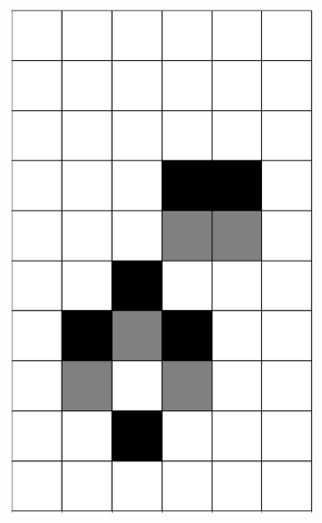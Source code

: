 \documentclass[12pt]{article}
\numberwithin{figure}{section} %
\begin{document}
\begin{figure}[H]
 \begin{subfigure}{0.3\textwidth}
     \centering
     \includegraphics[angle=270,width=\linewidth]{Section4/3.0}
     \subcaption{}
   \end{subfigure}
     \begin{subfigure}{0.3\textwidth}
     \centering

\end{subfigure}
\end{figure}
\end{document}
